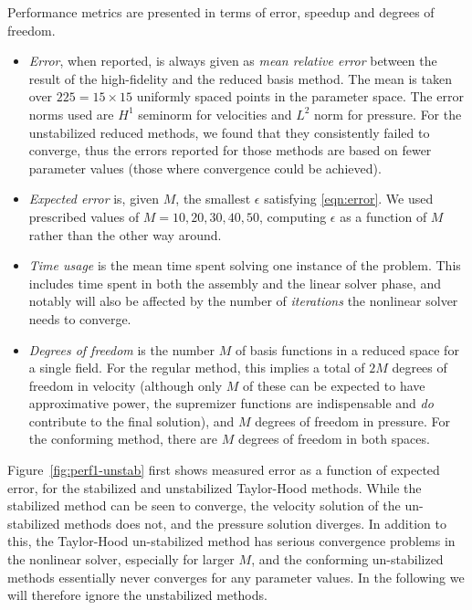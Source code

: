 \documentclass[onecolumn, twoside, a4paper, 11pt]{article}
\begin{document}
Performance metrics are presented in terms of error, speedup and degrees of
freedom.
\begin{itemize}
  \item \emph{Error}, when reported, is always given as
    \emph{mean relative error} between the result of the high-fidelity and the
    reduced basis method. The mean is taken over $225 = 15 \times 15$ uniformly
    spaced points in the parameter space. The error norms used are $H^1$
    seminorm for velocities and $L^2$ norm for pressure. For the
    unstabilized reduced methods, we found that they consistently failed to
    converge, thus the errors reported for those methods are based on fewer
    parameter values (those where convergence could be achieved).
  \item \emph{Expected error} is, given $M$, the smallest $\epsilon$ satisfying
    \eqref{eqn:error}. We used prescribed values of $M=10,20,30,40,50$,
    computing $\epsilon$ as a function of $M$ rather than the other way around.
  \item \emph{Time usage} is the mean time spent solving one instance of the problem. This includes
    time spent in both the assembly and the linear solver phase, and notably will also be affected
    by the number of \emph{iterations} the nonlinear solver needs to converge.
  \item \emph{Degrees of freedom} is the number $M$ of basis functions in a reduced space for a
    single field. For the regular method, this implies a total of $2M$ degrees of freedom in
    velocity (although only $M$ of these can be expected to have approximative power, the supremizer
    functions are indispensable and \emph{do} contribute to the final solution), and $M$ degrees of
    freedom in pressure.  For the conforming method, there are $M$ degrees of freedom in both
    spaces.
\end{itemize}

Figure~\ref{fig:perf1-unstab} first shows measured error as a function of expected error, for the
stabilized and unstabilized Taylor-Hood methods. While the stabilized method can be seen to
converge, the velocity solution of the un-stabilized methods does not, and the pressure solution
diverges. In addition to this, the Taylor-Hood un-stabilized method has serious convergence
problems in the nonlinear solver, especially for larger $M$, and the conforming un-stabilized
methods essentially never converges for any parameter values. In the following we will therefore
ignore the unstabilized methods.
\end{document}
